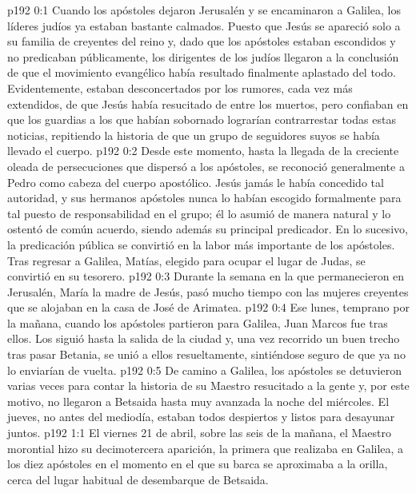 \author{Comisión de seres intermedios}
\vs p192 0:1 Cuando los apóstoles dejaron Jerusalén y se encaminaron a Galilea, los líderes judíos ya estaban bastante calmados. Puesto que Jesús se apareció solo a su familia de creyentes del reino y, dado que los apóstoles estaban escondidos y no predicaban públicamente, los dirigentes de los judíos llegaron a la conclusión de que el movimiento evangélico había resultado finalmente aplastado del todo. Evidentemente, estaban desconcertados por los rumores, cada vez más extendidos, de que Jesús había resucitado de entre los muertos, pero confiaban en que los guardias a los que habían sobornado lograrían contrarrestar todas estas noticias, repitiendo la historia de que un grupo de seguidores suyos se había llevado el cuerpo.
\vs p192 0:2 Desde este momento, hasta la llegada de la creciente oleada de persecuciones que dispersó a los apóstoles, se reconoció generalmente a Pedro como cabeza del cuerpo apostólico. Jesús jamás le había concedido tal autoridad, y sus hermanos apóstoles nunca lo habían escogido formalmente para tal puesto de responsabilidad en el grupo; él lo asumió de manera natural y lo ostentó de común acuerdo, siendo además su principal predicador. En lo sucesivo, la predicación pública se convirtió en la labor más importante de los apóstoles. Tras regresar a Galilea, Matías, elegido para ocupar el lugar de Judas, se convirtió en su tesorero.
\vs p192 0:3 Durante la semana en la que permanecieron en Jerusalén, María la madre de Jesús, pasó mucho tiempo con las mujeres creyentes que se alojaban en la casa de José de Arimatea.
\vs p192 0:4 Ese lunes, temprano por la mañana, cuando los apóstoles partieron para Galilea, Juan Marcos fue tras ellos. Los siguió hasta la salida de la ciudad y, una vez recorrido un buen trecho tras pasar Betania, se unió a ellos resueltamente, sintiéndose seguro de que ya no lo enviarían de vuelta.
\vs p192 0:5 De camino a Galilea, los apóstoles se detuvieron varias veces para contar la historia de su Maestro resucitado a la gente y, por este motivo, no llegaron a Betsaida hasta muy avanzada la noche del miércoles. El jueves, no antes del mediodía, estaban todos despiertos y listos para desayunar juntos.
\vs p192 1:1 El viernes 21 de abril, sobre las seis de la mañana, el Maestro morontial hizo su decimotercera aparición, la primera que realizaba en Galilea, a los diez apóstoles en el momento en el que su barca se aproximaba a la orilla, cerca del lugar habitual de desembarque de Betsaida.
